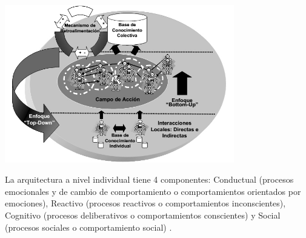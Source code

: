 \begin{ilustracion}[fuente=\cite{perozo2011}, etiqueta=componente-masoes, titulo={Componentes de MASOES a Nivel Colectivo}]
\includegraphics[width=10cm]{ilustraciones/marco-teorico/componente-masoes.jpg}
\end{ilustracion}


La arquitectura a nivel individual tiene 4 componentes: Conductual (procesos
emocionales y de cambio de comportamiento o comportamientos orientados por
emociones), Reactivo (procesos reactivos o comportamientos inconscientes),
Cognitivo (procesos deliberativos o comportamientos conscientes) y Social
(procesos sociales o comportamiento social) .

